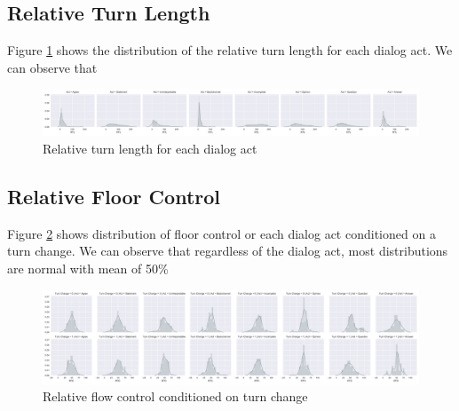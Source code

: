 \subsection{Relative Turn Length}

Figure \ref{l5} shows the distribution of the relative turn length for each dialog act. We can observe
that 

\begin{figure}[ht!]
\centering
\includegraphics[width=\textwidth]{../scikitlearn/figures/grid_precent_secs_sofar_by_da_name.pdf}
\caption{Relative turn length for each dialog act\label{overflow}}
\label{l5}
\end{figure}
 

\subsection{Relative Floor Control}

Figure \ref{l6} shows distribution of floor control or each dialog act conditioned on a turn change. We can observe that regardless of the dialog act, most distributions are normal with mean of 50\%

\begin{figure}[ht!]
\centering
\includegraphics[width=\textwidth]{../scikitlearn/figures/grid_timecontrol_by_da_name_by_tchange.pdf}
\caption{Relative flow control conditioned on turn change\label{overflow}}
\label{l6}
\end{figure}


